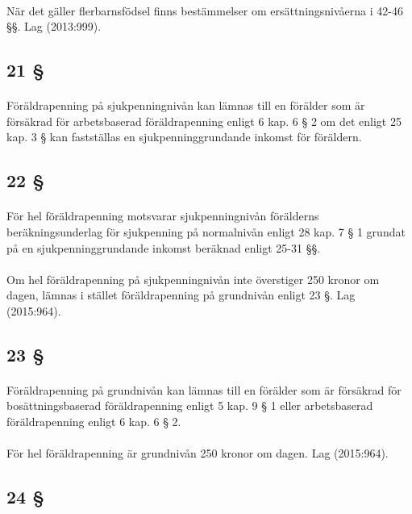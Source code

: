 \documentclass[a4paper,notitlepage,openany,10pt]{book}
\begin{document}
\paragraph*{}
När det gäller flerbarnsfödsel finns bestämmelser om ersättningsnivåerna i 42-46 §§.
Lag (2013:999).
\subsection*{21 §}
\paragraph*{}
Föräldrapenning på sjukpenningnivån kan lämnas till en förälder som är försäkrad för arbetsbaserad föräldrapenning enligt 6 kap. 6 § 2 om det enligt 25 kap. 3 § kan fastställas en sjukpenninggrundande inkomst för föräldern.
\subsection*{22 §}
\paragraph*{}
För hel föräldrapenning motsvarar sjukpenningnivån förälderns beräkningsunderlag för sjukpenning på normalnivån enligt 28 kap. 7 § 1 grundat på en sjukpenninggrundande inkomst beräknad enligt 25-31 §§.
\paragraph*{}
Om hel föräldrapenning på sjukpenningnivån inte överstiger 250 kronor om dagen, lämnas i stället föräldrapenning på grundnivån enligt 23 §.
Lag (2015:964).
\subsection*{23 §}
\paragraph*{}
Föräldrapenning på grundnivån kan lämnas till en förälder som är försäkrad för bosättningsbaserad föräldrapenning enligt 5 kap. 9 § 1 eller arbetsbaserad föräldrapenning enligt 6 kap. 6 § 2.
\paragraph*{}
För hel föräldrapenning är grundnivån 250 kronor om dagen.
Lag (2015:964).
\subsection*{24 §}
\end{document}
